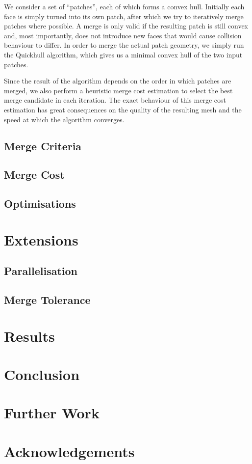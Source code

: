 \documentclass[format=sigconf]{acmart}
\begin{document}
We consider a set of ``patches'', each of which forms a convex hull. Initially each face is simply turned into its own patch, after which we try to iteratively merge patches where possible. A merge is only valid if the resulting patch is still convex and, most importantly, does not introduce new faces that would cause collision behaviour to differ. In order to merge the actual patch geometry, we simply run the Quickhull algorithm, which gives us a minimal convex hull of the two input patches.

Since the result of the algorithm depends on the order in which patches are merged, we also perform a heuristic merge cost estimation to select the best merge candidate in each iteration. The exact behaviour of this merge cost estimation has great consequences on the quality of the resulting mesh and the speed at which the algorithm converges.

\subsection{Merge Criteria}
\subsection{Merge Cost}
\subsection{Optimisations}

\section{Extensions}\label{extensions}
\subsection{Parallelisation}
\subsection{Merge Tolerance}

\section{Results}\label{results}


\section{Conclusion}\label{conclusion}


\section{Further Work}\label{further-work}


\section{Acknowledgements}\label{acknowledgements}



\end{document}
